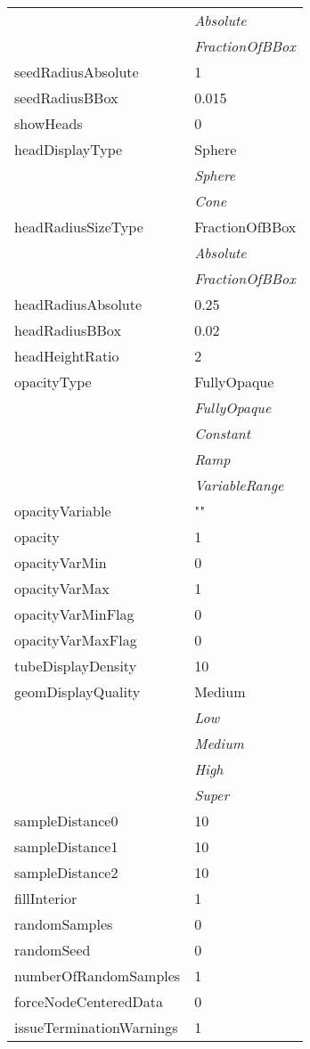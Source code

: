 \documentclass[10pt,a4paper]{report}
\begin{document}
\begin{longtable}{ll}
 & {\it  Absolute} \\
 & {\it  FractionOfBBox} \\
seedRadiusAbsolute  &  1 \\
seedRadiusBBox  &  0.015 \\
showHeads  &  0 \\
headDisplayType  &  Sphere   \\
 & {\it  Sphere} \\
 & {\it  Cone} \\
headRadiusSizeType  &  FractionOfBBox   \\
 & {\it  Absolute} \\
 & {\it  FractionOfBBox} \\
headRadiusAbsolute  &  0.25 \\
headRadiusBBox  &  0.02 \\
headHeightRatio  &  2 \\
opacityType  &  FullyOpaque   \\
 & {\it  FullyOpaque} \\
 & {\it  Constant} \\
 & {\it  Ramp} \\
 & {\it  VariableRange} \\
opacityVariable  &  "" \\
opacity  &  1 \\
opacityVarMin  &  0 \\
opacityVarMax  &  1 \\
opacityVarMinFlag  &  0 \\
opacityVarMaxFlag  &  0 \\
tubeDisplayDensity  &  10 \\
geomDisplayQuality  &  Medium   \\
 & {\it  Low} \\
 & {\it  Medium} \\
 & {\it  High} \\
 & {\it  Super} \\
sampleDistance0  &  10 \\
sampleDistance1  &  10 \\
sampleDistance2  &  10 \\
fillInterior  &  1 \\
randomSamples  &  0 \\
randomSeed  &  0 \\
numberOfRandomSamples  &  1 \\
forceNodeCenteredData  &  0 \\
issueTerminationWarnings  &  1 \\

\end{longtable}
\end{document}
